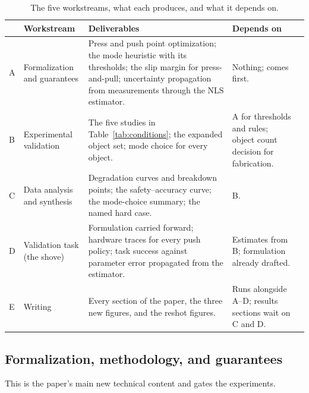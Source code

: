\documentclass[10pt, conference]{IEEEtran}
\begin{document}
\begin{table}[t]
\centering
\caption{The five workstreams, what each produces, and what it depends on.}
\label{tab:plan}
\footnotesize
\begin{tabular}{@{}R{0.4cm} R{3.0cm} R{6.0cm} R{4.2cm} R{1.6cm}@{}}
\toprule
& \textbf{Workstream} & \textbf{Deliverables} & \textbf{Depends on}\\
\midrule
A & Formalization and guarantees 
  & Press and push point optimization; the mode heuristic with its thresholds; the slip margin for press-and-pull; uncertainty propagation from measurements through the NLS estimator.
  & Nothing; comes first.\\ \addlinespace
B & Experimental validation
  & The five studies in Table~\ref{tab:conditions}; the expanded object
    set; mode choice for every object.
  & A for thresholds and rules; object count decision for fabrication.\\ \addlinespace
C & Data analysis and synthesis
  & Degradation curves and breakdown points; the safety--accuracy curve;
    the mode-choice summary; the named hard case.
  & B.\\ \addlinespace
D & Validation task (the shove)
  & Formulation carried forward; hardware traces for every push policy;
    task success against parameter error propagated from the estimator.
  & Estimates from B; formulation already drafted.\\ \addlinespace
E & Writing
  & Every section of the paper, the three new figures, and the
    reshot figures.
  & Runs alongside A--D; results sections wait on C and D.\\
\bottomrule
\end{tabular}
\end{table}

\subsection{Formalization, methodology, and guarantees}

This is the paper's main new technical content and gates the experiments.
\end{document}
